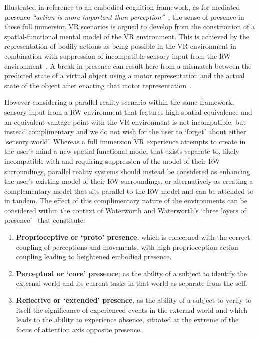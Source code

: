 Illustrated in reference to an embodied cognition framework, as for mediated presence \textit{``action is more important than perception''}~\cite{Giuseppe2014}, the sense of presence in these full immersion VR scenarios is argued to develop from the construction of a spatial-functional mental model of the VR environment. This is achieved by the representation of bodily actions as being possible in the VR environment in combination with suppression of incompatible sensory input from the RW environment~\cite{Schubert2001}. A break in presence can result here from a mismatch between the predicted state of a virtual object using a motor representation and the actual state of the object after enacting that motor representation~\cite{Giuseppe2014}.

However considering a parallel reality scenario within the same framework, sensory input from a RW environment that features high spatial equivalence and an equivalent vantage point with the VR environment is not incompatible, but instead complimentary and we do not wish for the user to `forget' about either `sensory world'. Whereas a full immersion VR experience attempts to create in the user's mind a new spatial-functional model that exists separate to, likely incompatible with and requiring suppression of the model of their RW surroundings, parallel reality systems should instead be considered as enhancing the user's existing model of their RW surroundings, or alternatively as creating a complementary model that sits parallel to the RW model and can be attended to in tandem. The effect of this complimentary nature of the environments can be considered within the context of Waterworth and Waterworth's `three layers of presence'~\cite{Mantovani2010, Giuseppe2014} that constitute:

\begin{enumerate}

\item \textbf{Proprioceptive or `proto' presence}, which is concerned with the correct coupling of perceptions and movements, with high proprioception-action coupling leading to heightened embodied presence.

\item \textbf{Perceptual or `core' presence}, as the ability of a subject to identify the external world and its current tasks in that world as separate from the self.

\item \textbf{Reflective or `extended' presence}, as the ability of a subject to verify to itself the significance of experienced events in the external world and which leads to the ability to experience absence, situated at the extreme of the focus of attention axis opposite presence.

\end{enumerate}

